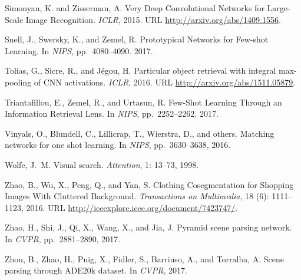 \documentclass{article}
\begin{document}
\begin{thebibliography}{42}
Simonyan, K. and Zisserman, A.
\newblock Very {Deep} {Convolutional} {Networks} for {Large}-{Scale} {Image}
  {Recognition}.
\newblock \emph{{ICLR}}, 2015.
\newblock URL \url{http://arxiv.org/abs/1409.1556}.

Snell, J., Swersky, K., and Zemel, R.
\newblock Prototypical {Networks} for {Few}-shot {Learning}.
\newblock In \emph{{NIPS}}, pp.\  4080--4090. 2017.

Tolias, G., Sicre, R., and J{\'e}gou, H.
\newblock Particular object retrieval with integral max-pooling of {CNN}
  activations.
\newblock \emph{{ICLR}}, 2016.
\newblock URL \url{http://arxiv.org/abs/1511.05879}.

Triantafillou, E., Zemel, R., and Urtasun, R.
\newblock Few-{Shot} {Learning} {Through} an {Information} {Retrieval} {Lens}.
\newblock In \emph{{NIPS}}, pp.\  2252--2262. 2017.

Vinyals, O., Blundell, C., Lillicrap, T., Wierstra, D., and {others}.
\newblock Matching networks for one shot learning.
\newblock In \emph{{NIPS}}, pp.\  3630--3638, 2016.

Wolfe, J.~M.
\newblock Visual search.
\newblock \emph{Attention}, 1: 13--73, 1998.

Zhao, B., Wu, X., Peng, Q., and Yan, S.
\newblock Clothing {Cosegmentation} for {Shopping} {Images} {With} {Cluttered}
  {Background}.
\newblock \emph{Transactions on Multimedia}, 18 (6):
  1111--1123, 2016.
\newblock URL \url{http://ieeexplore.ieee.org/document/7423747/}.

Zhao, H., Shi, J., Qi, X., Wang, X., and Jia, J.
\newblock Pyramid scene parsing network.
\newblock In \emph{{CVPR}}, pp.\  2881--2890, 2017.

Zhou, B., Zhao, H., Puig, X., Fidler, S., Barriuso, A., and Torralba, A.
\newblock Scene parsing through {ADE20k} dataset.
\newblock In \emph{{CVPR}}, 2017.

\end{thebibliography}
 



\newpage
\end{document}
